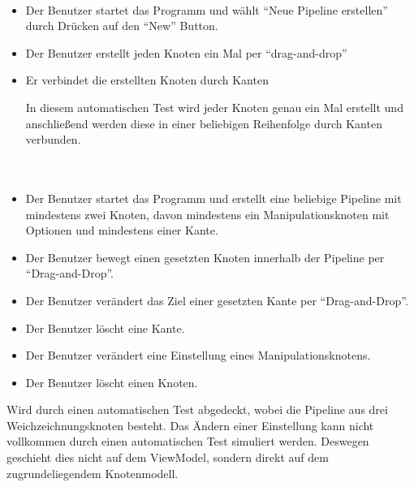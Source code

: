 \paragraph{}
\begin{itemize}
	\item Der Benutzer startet das Programm und wählt ``Neue Pipeline erstellen'' durch Drücken auf den ``New'' Button.
	\item Der Benutzer erstellt jeden Knoten ein Mal per ``drag-and-drop''
	\item Er verbindet die erstellten Knoten durch Kanten
	
	In diesem automatischen Test wird jeder Knoten genau ein Mal erstellt und anschließend werden diese in einer beliebigen Reihenfolge durch Kanten verbunden.
\end{itemize}

\paragraph{} ~\\

\begin{itemize}
	\item Der Benutzer startet das Programm und erstellt eine beliebige Pipeline mit mindestens zwei Knoten, davon mindestens ein Manipulationsknoten mit Optionen und mindestens einer Kante.
			\item Der Benutzer bewegt einen gesetzten Knoten innerhalb der Pipeline per ``Drag-and-Drop''.
			\item Der Benutzer verändert das Ziel einer gesetzten Kante per ``Drag-and-Drop''.
			\item Der Benutzer löscht eine Kante.
			\item Der Benutzer verändert eine Einstellung eines Manipulationsknotens.
			\item Der Benutzer löscht einen Knoten.
\end{itemize}

Wird durch einen automatischen Test abgedeckt, wobei die Pipeline aus drei Weichzeichnungsknoten besteht. Das Ändern einer Einstellung kann nicht vollkommen durch einen automatischen Test simuliert werden. Deswegen geschieht dies nicht auf dem ViewModel, sondern direkt auf dem zugrundeliegendem Knotenmodell.

\paragraph{} ~\\


